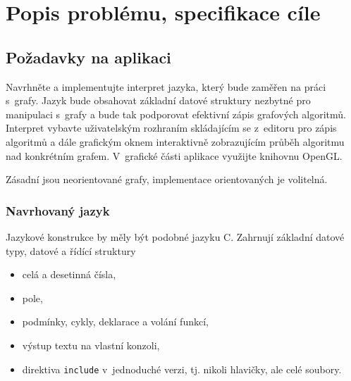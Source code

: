 \documentclass[11pt,twoside,a4paper]{book}
\begin{document}

\chapter{Popis problému, specifikace cíle}
\label{popis_problemu_specifikace_cile}



\section{Požadavky na aplikaci}

Navrhněte a implementujte interpret jazyka, který bude zaměřen na práci s~grafy. Jazyk bude obsahovat základní datové struktury nezbytné pro manipulaci s~grafy a bude tak podporovat efektivní zápis grafových algoritmů. Interpret vybavte uživatelským rozhraním skládajícím se z~editoru pro zápis algoritmů a dále grafickým oknem interaktivně zobrazujícím průběh algoritmu nad konkrétním grafem. V~grafické části aplikace využijte knihovnu OpenGL.

Zásadní jsou neorientované grafy, implementace orientovaných je volitelná.

\subsection{Navrhovaný jazyk}

Jazykové konstrukce by měly být podobné jazyku C. Zahrnují základní datové typy, datové a řídící struktury

\begin{itemize}
\item celá a desetinná čísla,
\item pole,
\item podmínky, cykly, deklarace a volání funkcí,
\item výstup textu na vlastní konzoli,
\item direktiva \texttt{include} v~jednoduché verzi, tj. nikoli hlavičky, ale celé soubory.
\end{itemize}
\end{document}
